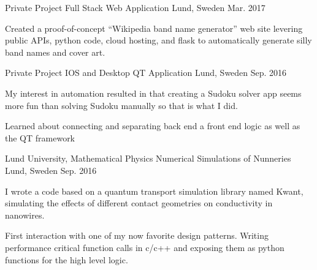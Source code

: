 \begin{cventries}
\cventry
{Private Project} %
{Full Stack Web Application } %
{Lund, Sweden} %
{Mar. 2017 } %
{ %
\begin{cvitems}
\item {Created a proof-of-concept ``Wikipedia band name generator'' web site
levering public APIs, python code, cloud hosting, and flask to automatically
generate silly band names and cover art.}
\end{cvitems}
}

\cventry
{Private Project} %
{IOS and Desktop QT Application } %
{Lund, Sweden} %
{Sep. 2016 } %
{ %
\begin{cvitems}
\item {My interest in automation resulted in that creating a Sudoku solver app
seems more fun than solving Sudoku manually so that is what I did.}
\item {Learned about connecting and separating back end a front end logic
as well as the QT framework }
\end{cvitems}
}

\cventry
{Lund University, Mathematical Physics} %
{Numerical Simulations of Nunneries } %
{Lund, Sweden} %
{Sep. 2016 } %
{ %
\begin{cvitems}
\item {  I wrote a code based on a quantum transport simulation library named
Kwant, simulating the effects of different contact geometries on
conductivity in nanowires. }
\item {First interaction with one of my now favorite design patterns. Writing
performance critical function calls in c/c++ and exposing them as python
functions for the high level logic.}
\end{cvitems}
}


\end{cventries}
